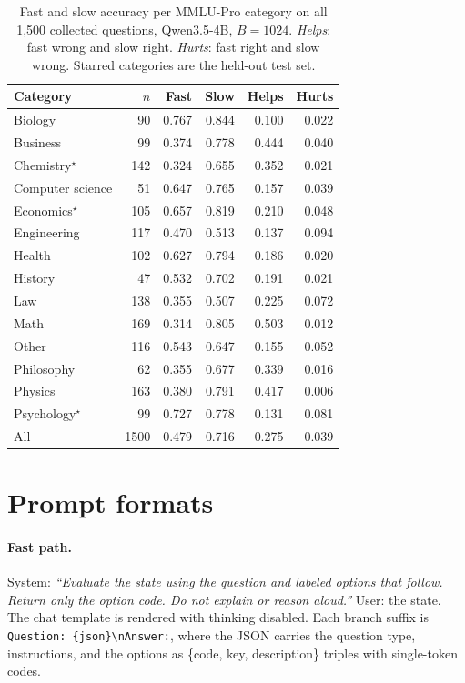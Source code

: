 \documentclass{article}
\begin{document}
\begin{table}[h]
\caption{Fast and slow accuracy per MMLU-Pro category on all 1{,}500 collected questions, Qwen3.5-4B, $B=1024$. \emph{Helps}: fast wrong and slow right. \emph{Hurts}: fast right and slow wrong. Starred categories are the held-out test set.}
\label{tab:categories}
\centering
\small
\begin{tabular}{lrrrrr}
\toprule
Category & $n$ & Fast & Slow & Helps & Hurts \\
\midrule
Biology & 90 & 0.767 & 0.844 & 0.100 & 0.022 \\
Business & 99 & 0.374 & 0.778 & 0.444 & 0.040 \\
Chemistry$^\star$ & 142 & 0.324 & 0.655 & 0.352 & 0.021 \\
Computer science & 51 & 0.647 & 0.765 & 0.157 & 0.039 \\
Economics$^\star$ & 105 & 0.657 & 0.819 & 0.210 & 0.048 \\
Engineering & 117 & 0.470 & 0.513 & 0.137 & 0.094 \\
Health & 102 & 0.627 & 0.794 & 0.186 & 0.020 \\
History & 47 & 0.532 & 0.702 & 0.191 & 0.021 \\
Law & 138 & 0.355 & 0.507 & 0.225 & 0.072 \\
Math & 169 & 0.314 & 0.805 & 0.503 & 0.012 \\
Other & 116 & 0.543 & 0.647 & 0.155 & 0.052 \\
Philosophy & 62 & 0.355 & 0.677 & 0.339 & 0.016 \\
Physics & 163 & 0.380 & 0.791 & 0.417 & 0.006 \\
Psychology$^\star$ & 99 & 0.727 & 0.778 & 0.131 & 0.081 \\
\midrule
All & 1500 & 0.479 & 0.716 & 0.275 & 0.039 \\
\bottomrule
\end{tabular}
\end{table}

\section{Prompt formats}

\paragraph{Fast path.}
System: \emph{``Evaluate the state using the question and labeled options that follow. Return only the option code. Do not explain or reason aloud.''} User: the state. The chat template is rendered with thinking disabled. Each branch suffix is \texttt{Question: \{json\}\textbackslash nAnswer:}, where the JSON carries the question type, instructions, and the options as \{code, key, description\} triples with single-token codes.
\end{document}
